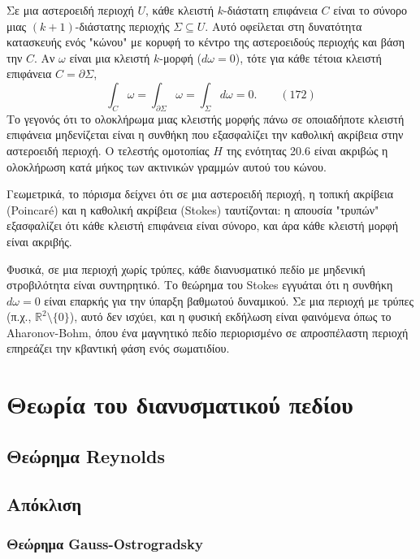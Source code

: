 \documentclass[12pt]{article}
\begin{document}
Σε μια αστεροειδή περιοχή $U$, κάθε κλειστή $k$-διάστατη επιφάνεια $C$ είναι το σύνορο μιας $(k+1)$-διάστατης περιοχής $\Sigma \subseteq U$. Αυτό οφείλεται στη δυνατότητα κατασκευής ενός "κώνου" με κορυφή το κέντρο της αστεροειδούς περιοχής και βάση την $C$. Αν $\omega$ είναι μια κλειστή $k$-μορφή ($d\omega = 0$), τότε για κάθε τέτοια κλειστή επιφάνεια $C = \partial \Sigma$,
\begin{equation}
\int_C \omega = \int_{\partial \Sigma} \omega = \int_\Sigma d\omega = 0. \qquad (172)
\end{equation}
Το γεγονός ότι το ολοκλήρωμα μιας κλειστής μορφής πάνω σε οποιαδήποτε κλειστή επιφάνεια μηδενίζεται είναι η συνθήκη που εξασφαλίζει την καθολική ακρίβεια στην αστεροειδή περιοχή. Ο τελεστής ομοτοπίας $H$ της ενότητας 20.6 είναι ακριβώς η ολοκλήρωση κατά μήκος των ακτινικών γραμμών αυτού του κώνου.

Γεωμετρικά, το πόρισμα δείχνει ότι σε μια αστεροειδή περιοχή, η τοπική ακρίβεια (Poincaré) και η καθολική ακρίβεια (Stokes) ταυτίζονται: η απουσία "τρυπών" εξασφαλίζει ότι κάθε κλειστή επιφάνεια είναι σύνορο, και άρα κάθε κλειστή μορφή είναι ακριβής.

Φυσικά, σε μια περιοχή χωρίς τρύπες, κάθε διανυσματικό πεδίο με μηδενική στροβιλότητα είναι συντηρητικό. Το θεώρημα του Stokes εγγυάται ότι η συνθήκη $d\omega = 0$ είναι επαρκής για την ύπαρξη βαθμωτού δυναμικού. Σε μια περιοχή με τρύπες (π.χ., $\mathbb{R}^2 \setminus \{0\}$), αυτό δεν ισχύει, και η φυσική εκδήλωση είναι φαινόμενα όπως το Aharonov-Bohm, όπου ένα μαγνητικό πεδίο περιορισμένο σε απροσπέλαστη περιοχή επηρεάζει την κβαντική φάση ενός σωματιδίου.

\section{Θεωρία του διανυσματικού πεδίου}

\subsection{Θεώρημα Reynolds}

\subsection{Απόκλιση}

\subsubsection{Θεώρημα Gauss-Ostrogradsky}
\end{document}
